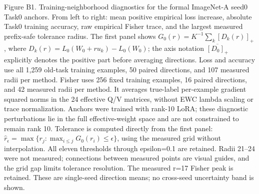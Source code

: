 \caption{Figure B1. Training-neighborhood diagnostics for the formal ImageNet-A seed0 Task0 anchors. From left to right: mean positive empirical loss increase, absolute Task0 training accuracy, raw empirical Fisher trace, and the largest measured prefix-safe tolerance radius. The first panel shows $G_0(r)=K^{-1}\sum_k[D_k(r)]_+$, where $D_k(r)=L_0(W_0+ru_k)-L_0(W_0)$; the axis notation $\overline{[D_0]_+}$ explicitly denotes the positive part before averaging directions. Loss and accuracy use all 1,259 old-task training examples, 50 paired directions, and 107 measured radii per method. Fisher uses 256 fixed training examples, 16 paired directions, and 42 measured radii per method. It averages true-label per-example gradient squared norms in the 24 effective Q/V matrices, without EWC lambda scaling or trace normalization. Anchors were trained with rank-10 LoRA; these diagnostic perturbations lie in the full effective-weight space and are not constrained to remain rank 10. Tolerance is computed directly from the first panel: $\hat r_\epsilon=\max\{r_j:\max_{i\leq j}G_0(r_i)\leq\epsilon\}$, using the measured grid without interpolation. All eleven thresholds through epsilon=0.1 are retained. Radii 21–24 were not measured; connections between measured points are visual guides, and the grid gap limits tolerance resolution. The measured r=17 Fisher peak is retained. These are single-seed direction means; no cross-seed uncertainty band is shown.}
